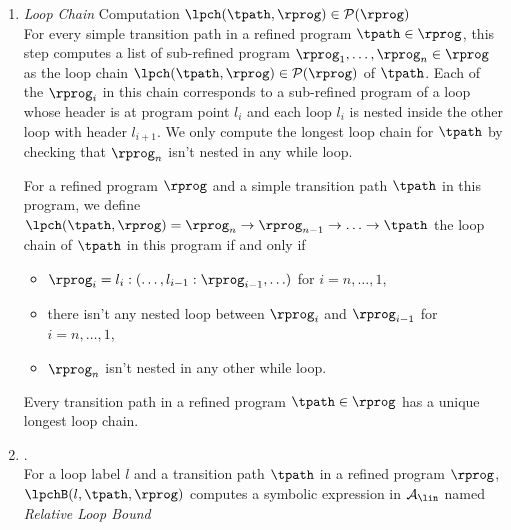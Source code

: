 \begin{enumerate}
  \item \emph{Loop Chain} Computation $\lpch(\tpath, \rprog) \in \mathcal{P}(\rprog)$ 
  \\
  For every simple transition path in a refined program $\tpath \in \rprog$,
  this step computes 
  a list of sub-refined program $\rprog_1, \ldots, \rprog_n \in \rprog$
  as the loop chain $\lpch(\tpath, \rprog) \in \mathcal{P}(\rprog)$ of $\tpath$.
  Each of the $\rprog_i$ in this chain corresponds to a sub-refined program of a loop whose header is at program point $l_i$ and
 each loop $l_{i}$ is nested inside the other loop with header $l_{i+1}$.
 We only compute the longest loop chain for $\tpath$ by checking that
$\rprog_n$ isn't nested in any while loop.
\begin{defn}
  \label{def:loopchain}
For a refined program $\rprog$ and a simple transition path $\tpath$ in this program, we define
$\lpch(\tpath, \rprog) = 
\rprog_n \to \rprog_{n-1} \to \ldots \to \tpath$
the loop chain of
$\tpath$ in this program if and only if 
%
\begin{itemize}
\item $\rprog_{i}= l_i : (\ldots, l_{i - 1} : \rprog_{i-1}, \ldots)$ for $i = n, \ldots, 1$,
\item there isn't any nested loop between $\rprog_{i}$ and $\rprog_{i - 1}$ for $i = n, \ldots, 1$,
 \item $\rprog_n$ isn't nested in any other while loop.
\end{itemize}
\end{defn}
%
Every transition path in a refined program $\tpath \in \rprog$ has a unique longest loop chain.
%
%
%
\item  {}.
\\
For a loop label $l$ and a transition path $\tpath$ in a refined program $\rprog$,
 $\lpchB(l, \tpath, \rprog)$ computes a symbolic expression in $\mathcal{A}_{\lin}$ named \emph{Relative Loop Bound}

\end{enumerate}

